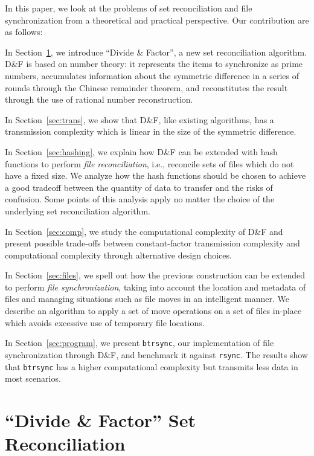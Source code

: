 \documentclass[twoside,envcountsame,runningheads]{llncs}
\newcommand{\df}{D\&F\xspace}
\newcommand{\btrsync}{\texttt{btrsync}\xspace}
\newcommand{\rsync}{\texttt{rsync}\xspace}
\begin{document}
In this paper, we look at the problems of set reconciliation and file
synchronization from a theoretical and practical perspective. Our contribution
are as follows:
\begin{compactitem}
  \item In Section~\ref{sec:dandf}, we introduce ``Divide \& Factor'', a new set
    reconciliation algorithm. \df is based on number theory: it represents the
    items to synchronize as prime numbers, accumulates information about the
    symmetric difference in a series of rounds through the Chinese remainder
    theorem, and reconstitutes the result through the use of rational number
    reconstruction.
  \item In Section~\ref{sec:trans}, we show that \df, like existing algorithms,
    has a transmission complexity which is linear in the size of the symmetric
    difference.%
  \item In Section~\ref{sec:hashing}, we explain how \df can be extended with
    hash functions to perform \emph{file reconciliation}, i.e., reconcile sets
    of files which do not have a fixed size. We analyze how the hash functions
    should be chosen to achieve a good tradeoff between the quantity of data to
    transfer and the risks of confusion. Some points of this analysis apply no
    matter the choice of the underlying set reconciliation algorithm.
  \item In Section~\ref{sec:comp}, we study the computational complexity of \df
    and present possible trade-offs between constant-factor transmission
    complexity and computational complexity through alternative design choices.
  \item In Section~\ref{sec:files}, we spell out how the previous construction
    can be extended to perform \emph{file synchronization}, taking into account
    the location and metadata of files and managing situations such as file
    moves in an intelligent manner. We describe an algorithm to apply a set of
    move operations on a set of files in-place which avoids excessive use of
    temporary file locations.
  \item In Section~\ref{sec:program}, we present \btrsync, our implementation
    of file synchronization through \df, and benchmark it against \rsync. The
    results show that \btrsync has a higher computational complexity but
    transmits less data in most scenarios.
\end{compactitem}

\section{``Divide \& Factor'' Set Reconciliation}
\label{sec:dandf}
\end{document}
